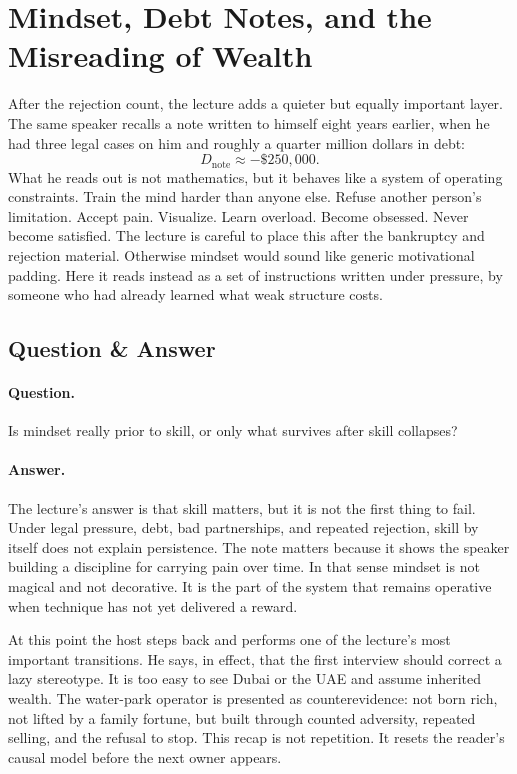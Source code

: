 \section{Mindset, Debt Notes, and the Misreading of Wealth}

After the rejection count, the lecture adds a quieter but equally important layer. The same speaker recalls a note written to himself eight years earlier, when he had three legal cases on him and roughly a quarter million dollars in debt:
\begin{equation}
D_{\text{note}}\approx -\$250{,}000.
\end{equation}
What he reads out is not mathematics, but it behaves like a system of operating constraints. Train the mind harder than anyone else. Refuse another person's limitation. Accept pain. Visualize. Learn overload. Become obsessed. Never become satisfied. The lecture is careful to place this after the bankruptcy and rejection material. Otherwise mindset would sound like generic motivational padding. Here it reads instead as a set of instructions written under pressure, by someone who had already learned what weak structure costs.

\subsection{Question \& Answer}

\paragraph{Question.}
Is mindset really prior to skill, or only what survives after skill collapses?

\paragraph{Answer.}
The lecture's answer is that skill matters, but it is not the first thing to fail. Under legal pressure, debt, bad partnerships, and repeated rejection, skill by itself does not explain persistence. The note matters because it shows the speaker building a discipline for carrying pain over time. In that sense mindset is not magical and not decorative. It is the part of the system that remains operative when technique has not yet delivered a reward.

At this point the host steps back and performs one of the lecture's most important transitions. He says, in effect, that the first interview should correct a lazy stereotype. It is too easy to see Dubai or the UAE and assume inherited wealth. The water-park operator is presented as counterevidence: not born rich, not lifted by a family fortune, but built through counted adversity, repeated selling, and the refusal to stop. This recap is not repetition. It resets the reader's causal model before the next owner appears.

